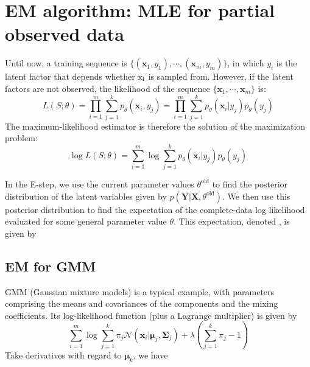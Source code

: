 \documentclass{article}
\begin{document}
\section{EM algorithm: MLE for partial observed data}
	Until now, a training sequence is $\{(\bm{x}_1,y_1),\cdots,(\bm{x}_m,y_m)\}$, in which $y_i$ is the latent factor that depends whether $\rm{x}_i$ is sampled from. However, if the latent factors are not observed, the likelihood of the sequence $\{\bm{x}_1,\cdots,\bm{x}_m\}$ is:
	\begin{equation*}
	L(S;\theta) = \prod_{i=1}^m \sum_{j=1}^k p_\theta(\bm{x}_i,y_j) = \prod_{i=1}^m \sum_{j=1}^k p_\theta(\bm{x}_i|y_j)p_\theta(y_j)
	\end{equation*}
	The maximum-likelihood estimator is therefore the solution of the maximization problem:
	\begin{equation}
	\log L(S;\theta) = \sum_{i=1}^m \log \sum_{j=1}^k p_\theta(\bm{x}_i|y_j)p_\theta(y_j)
	\end{equation}
	
	In the E-step, we use the current parameter values $\theta^{\mathrm{old}}$ to find the posterior distribution of the latent variables given by $p(\bm{Y}|\bm{X}, \theta^{\mathrm{old}})$. We then use this posterior distribution to find the expectation of the complete-data log likelihood evaluated for some general parameter value $\theta$. This expectation, denoted , is given by
	
	\subsection{EM for GMM}
	
	GMM (Gaussian mixture models) is a typical example, with parameters comprising the means and covariances of the components and the mixing coefficients. Its log-likelihood function (plus a Lagrange multiplier) is given by
	\begin{equation*}
	\sum_{i=1}^m \log \sum_{j=1}^k \pi_j \mathcal{N} (\bm{x}_i|\bm{\mu}_j,\bm{\Sigma}_j) + \lambda \left(\sum_{j=1}^k \pi_j - 1\right)
	\end{equation*}
	Take derivatives with regard to $\bm{\mu}_k$, we have
	
\end{document}
